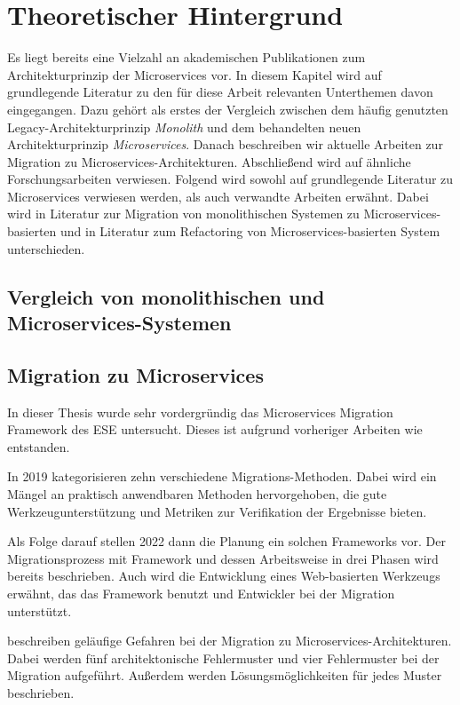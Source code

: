 \chapter{Theoretischer Hintergrund}
\label{chap:theoretischer-hintergrund}

Es liegt bereits eine Vielzahl an akademischen Publikationen zum Architekturprinzip der Microservices vor.
In diesem Kapitel wird auf grundlegende Literatur zu den für diese Arbeit relevanten Unterthemen davon eingegangen.
Dazu gehört als erstes der Vergleich zwischen dem häufig genutzten Legacy-Architekturprinzip \emph{Monolith} und dem behandelten neuen Architekturprinzip \emph{Microservices}.
Danach beschreiben wir aktuelle Arbeiten zur Migration zu Microservices-Architekturen.
Abschließend wird auf ähnliche Forschungsarbeiten verwiesen.
Folgend wird sowohl auf grundlegende Literatur zu Microservices verwiesen werden, als auch verwandte Arbeiten erwähnt.
Dabei wird in Literatur zur Migration von monolithischen Systemen zu Microservices-basierten und in Literatur zum Refactoring von Microservices-basierten System unterschieden.

\section{Vergleich von monolithischen und Microservices-Systemen}

\section{Migration zu Microservices}

In dieser Thesis wurde sehr vordergründig das Microservices Migration Framework des ESE  untersucht.
Dieses ist aufgrund vorheriger Arbeiten wie  entstanden.

In 2019 kategorisieren  zehn verschiedene Migrations-Methoden.
Dabei wird ein Mängel an praktisch anwendbaren Methoden hervorgehoben, die gute Werkzeugunterstützung und Metriken zur Verifikation der Ergebnisse bieten.

Als Folge darauf stellen  2022 dann die Planung ein solchen Frameworks vor. Der Migrationsprozess mit Framework und dessen Arbeitsweise in drei Phasen wird bereits beschrieben. Auch wird die Entwicklung eines Web-basierten Werkzeugs erwähnt, das das Framework benutzt und Entwickler bei der Migration unterstützt.

 beschreiben geläufige Gefahren bei der Migration zu Microservices-Architekturen.
Dabei  werden fünf architektonische Fehlermuster und vier Fehlermuster bei der Migration aufgeführt.
Außerdem werden Lösungsmöglichkeiten für jedes Muster beschrieben.

